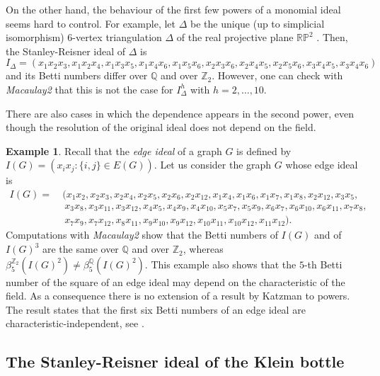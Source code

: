 \documentclass[11pt,oneside]{amsart}
\theoremstyle{plain}
\theoremstyle{definition}
\newtheorem{example}[theorem]{Example}
\newcommand{\Q}{\mathbb{Q}}
\newcommand{\Z}{\mathbb{Z}}
\begin{document}
\smallskip

On the other hand, the behaviour of the first few powers of a monomial ideal seems hard to control. For example, let $\Delta$ be the unique (up to simplicial isomorphism) $6$-vertex triangulation $\Delta$ of the real projective plane $\mathbb{RP}^2$ \cite{R76}. Then, the Stanley-Reisner ideal of $\Delta$ is 
\begin{equation}\tag{$\ast$}\label{Eq.ProjectivePlane}
I_\Delta \!=\! (x_1 x_2 x_3,\! x_1 x_2 x_4, x_1 x_3 x_5, x_1 x_4 x_6, x_1 x_5 x_6, x_2 x_3 x_6, x_2 x_4 x_5, x_2 x_5 x_6, x_3 x_4 x_5, x_3 x_4 x_6)
\end{equation}
and its Betti numbers differ over $\Q$ and over $\Z_2$. However, one can check with \textit{Macaulay2} \cite{M2} that this is not the case for $I_{\Delta}^h$ with $h=2,\dots,10$.

There are also cases in which the dependence appears in the second power, even though the resolution of the original ideal does not depend on the field.

\begin{example}\label{E.edgeIdealWithCharDepSquare}
Recall that the \textit{edge ideal} of a graph $G$ is defined by $I(G) = (x_i x_j : \{i,j\} \in E(G))$. Let us consider the graph $G$ whose edge ideal is
\begin{align*}
I(G)=&\ (x_1x_2,x_2x_3,x_2x_4,x_2x_5,x_2x_6,x_2x_{12},x_1x_4,x_1x_6,x_1x_7,x_1x_8,x_2x_{12},x_3x_5, \\
&\ \ x_3x_8, x_3x_{11}, x_3x_{12}, x_4x_5, x_4x_9, x_4x_{10}, x_5x_7, x_5x_9, x_6x_7, x_6x_{10}, x_6x_{11}, x_7x_8, \\
&\ \ x_7x_9, x_7x_{12}, x_8x_{11}, x_9x_{10}, x_9x_{12}, x_{10}x_{11}, x_{10}x_{12}, x_{11}x_{12}).
\end{align*}
Computations with \textit{Macaulay2} show that the Betti numbers of $I(G)$ and of $I(G)^3$ are the same over $\mathbb{Q}$ and over $\Z_2$, whereas $\beta^{\Z_2}_5(I(G)^2) \neq \beta^{\mathbb{Q}}_5(I(G)^2)$. This example also shows that the $5$-th Betti number of the square of an edge ideal may depend on the characteristic of the field. As a consequence there is
no extension of a result by Katzman to powers. The result states that the first six Betti numbers of an edge ideal are characteristic-independent, see \cite[Theorem 3.4 and Corollary 4.2]{K06}. 
\end{example}


\subsection{The Stanley-Reisner ideal of the Klein bottle}
\end{document}
